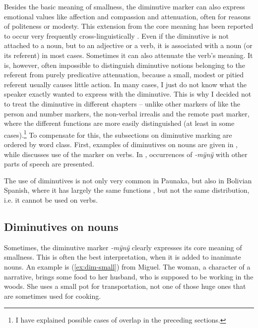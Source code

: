 Besides the basic meaning of smallness, the diminutive marker can also express emotional values like affection and compassion and attenuation, often for reasons of politeness or modesty. This extension from the core meaning has been reported to occur very frequently cross-linguistically \citep[535, 558]{Jurafsky1996}. Even if the diminutive is not attached to a noun, but to an adjective or a verb, it is associated with a noun (or its referent) in most cases. Sometimes it can also attenuate the verb’s meaning. It is, however, often impossible to distinguish diminutive notions belonging to the referent from purely predicative attenuation, because a small, modest or pitied referent usually causes little action. In many cases, I just do not know what the speaker exactly wanted to express with the diminutive. This is why I decided not to treat the diminutive in different chapters -- unlike other markers of  like the person and number markers, the non-verbal irrealis and the remote past marker, where the different functions are more easily distinguished (at least in some cases).\footnote{I have explained possible cases of overlap in the preceding sections.} To compensate for this, the subsections on diminutive marking are ordered by word class. First, examples of diminutives on nouns are given in , while  discusses use of the marker on verbs. In , occurrences of \textit{-mÿnÿ} with other parts of speech are presented.

The use of diminutives is not only very common in Paunaka, but also in Bolivian Spanish, where it has largely the same functions \citep[cf.][38]{Mendoza2015}, but not the same distribution, i.e. it cannot be used on verbs.


\subsection{Diminutives on nouns}\label{sec:Diminuitves_Nouns}

Sometimes, the diminutive marker \textit{-mÿnÿ} clearly expresses its core meaning of smallness. This is often the best interpretation, when it is added to inanimate nouns. An example is (\ref{ex:dim-small}) from Miguel. The woman, a character of a narrative, brings some food to her husband, who is supposed to be working in the woods. She uses a small pot for transportation, not one of those huge ones that are sometimes used for cooking. 

